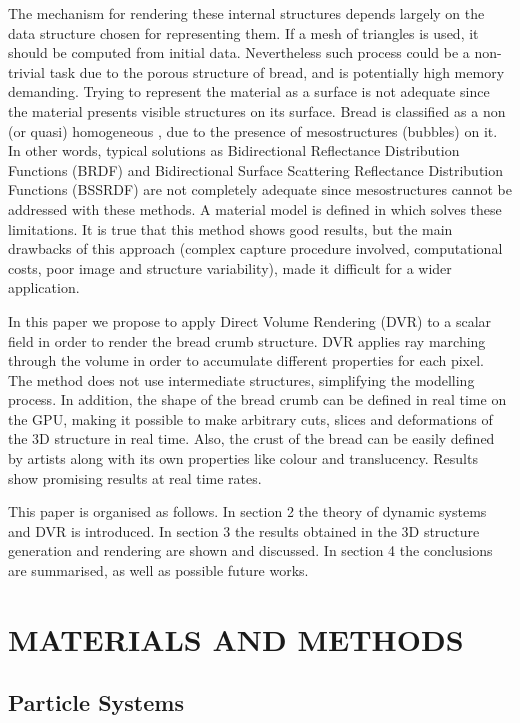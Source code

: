 \documentclass[oneside,a4paper,english,links]{amca}
\begin{document}
The mechanism for rendering these internal structures depends largely on the data structure chosen for representing them. If a mesh of triangles is used, it should be computed from initial data. Nevertheless such process could be a non-trivial task due to the porous structure of bread, and is potentially high memory demanding. Trying to represent the material as a surface is not adequate since the material presents visible structures on its surface. Bread is classified as a non (or quasi) homogeneous \citep{Tong2005}, due to the presence of mesostructures (bubbles) on it. In other words, typical solutions as Bidirectional Reflectance Distribution Functions (BRDF) \citep{Kurt2009} and Bidirectional Surface Scattering Reflectance Distribution Functions (BSSRDF) \citep{Donner2009} are not completely adequate since mesostructures cannot be addressed with these methods. A material model is defined in \citep{Tong2005} which solves these limitations. It is true that this method shows good results, but the main drawbacks of this approach (complex capture procedure involved, computational costs, poor image and structure variability), made it difficult for a wider application.

In this paper we propose to apply Direct Volume Rendering (DVR) \citep{Levoy1988,Kruger2003} to a scalar field in order to render the bread crumb structure. DVR applies ray marching through the volume in order to accumulate different properties for each pixel. The method does not use intermediate structures, simplifying the modelling process. In addition, the shape of the bread crumb can be defined in real time on the GPU, making it possible to make arbitrary cuts, slices and deformations of the 3D structure in real time. Also, the crust of the bread can be easily defined by artists along with its own properties like colour and translucency. Results show promising results at real time rates. 

This paper is organised as follows. In section 2 the theory of dynamic systems and DVR is introduced. In section 3 the results obtained in the 3D structure generation and rendering are shown and discussed. In section 4 the conclusions are summarised, as well as possible future works.

\section{MATERIALS AND METHODS}

\subsection{Particle Systems}
\end{document}
